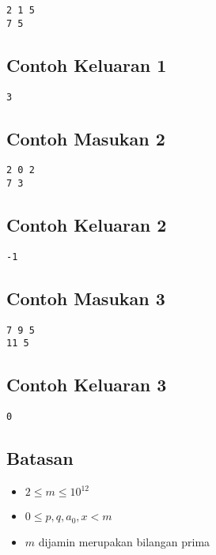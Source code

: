 \documentclass{article}
\begin{document}
\begin{lstlisting}
2 1 5
7 5
\end{lstlisting}

\subsection*{Contoh Keluaran 1}

\begin{lstlisting}
3
\end{lstlisting}

\subsection*{Contoh Masukan 2}

\begin{lstlisting}
2 0 2
7 3
\end{lstlisting}

\subsection*{Contoh Keluaran 2}

\begin{lstlisting}
-1
\end{lstlisting}

\subsection*{Contoh Masukan 3}

\begin{lstlisting}
7 9 5
11 5
\end{lstlisting}

\subsection*{Contoh Keluaran 3}

\begin{lstlisting}
0
\end{lstlisting}

\subsection*{Batasan}

\begin{itemize}
  \item $2 \leq m \leq 10^{12}$
  \item $0 \leq p, q, a_0, x < m$
  \item $m$ dijamin merupakan bilangan prima
\end{itemize}
\end{document}
